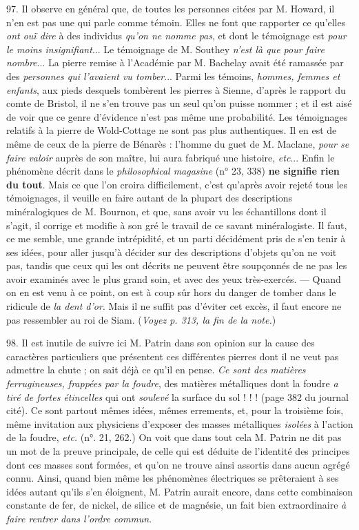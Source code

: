 \documentclass[a4paper, 11pt, oneside, polutonikogreek, french]{article}
\begin{document}
97. Il observe en général que, de toutes les personnes citées par M. Howard, il n'en est pas une qui parle comme témoin. \og Elles ne font que rapporter ce qu'elles \emph{ont ouï dire} à des individus \emph{qu'on ne nomme pas}, et dont le témoignage est \emph{pour le moins insignifiant}... Le témoignage de M. Southey \emph{n'est là que pour faire nombre}... La pierre remise à l'Académie par M. Bachelay avait été ramassée par des \emph{personnes qui l'avaient vu tomber}... Parmi les témoins, \emph{hommes, femmes et enfants}, aux pieds desquels tombèrent les pierres à Sienne, d'après le rapport du comte de Bristol, il ne s'en trouve pas un seul qu'on puisse nommer ; et il est aisé de voir que ce genre d'évidence n'est pas même une probabilité. Les témoignages relatifs à la pierre de Wold-Cottage ne sont pas plus authentiques. Il en est de même de ceux de la pierre de Bénarès : l'homme du guet de M. Maclane, \emph{pour se faire valoir} auprès de son maître, lui aura fabriqué une histoire, \emph{etc}... Enfin le phénomène décrit dans le \emph{philosophical magasine} (n° 23, 338) \textbf{ne signifie rien du tout}. \fg Mais ce que l'on croira difficilement, c'est qu'après avoir rejeté tous les témoignages, il veuille en faire autant de la plupart des descriptions minéralogiques de M. Bournon, et que, sans avoir vu les échantillons dont il s'agit, il corrige et modifie à son gré le travail de ce savant minéralogiste. Il faut, ce me semble, une grande intrépidité, et un parti décidément pris de s'en tenir à ses idées, pour aller jusqu'à décider sur des descriptions d'objets qu'on ne voit pas, tandis que ceux qui les ont décrits ne peuvent être soupçonnés de ne pas les avoir examinés avec le plus grand soin, et avec des yeux très-exercés. --- Quand on en est venu à ce point, on est à coup sûr hors du danger de tomber dans le ridicule de \emph{la dent d'or}. Mais il ne suffit pas d'éviter cet excès, il faut encore ne pas ressembler au roi de Siam. (\emph{Voyez p. 313, la fin de la note.})

98. Il est inutile de suivre ici M. Patrin dans son opinion sur la cause des caractères particuliers que présentent ces différentes pierres dont il ne veut pas admettre la chute ; on sait déjà ce qu'il en pense. \og \emph{Ce sont des matières ferrugineuses, frappées par la foudre}, des matières métalliques dont la foudre \emph{a tiré de fortes étincelles} qui ont \emph{soulevé} la surface du sol \fg ! ! ! (page 382 du journal cité). Ce sont partout mêmes idées, mêmes errements, et, pour la troisième fois, même invitation aux physiciens d'exposer des masses métalliques \emph{isolées} à l'action de la foudre, \emph{etc.} (n°. 21, 262.) On voit que dans tout cela M. Patrin ne dit pas un mot de la preuve principale, de celle qui est déduite de l'identité des principes dont ces masses sont formées, et qu'on ne trouve ainsi assortis dans aucun agrégé connu. Ainsi, quand bien même les phénomènes électriques se prêteraient à ses idées autant qu'ils s'en éloignent, M. Patrin aurait encore, dans cette combinaison constante de fer, de nickel, de silice et de magnésie, un fait bien extraordinaire \emph{à faire rentrer dans l'ordre commun}.
\end{document}
